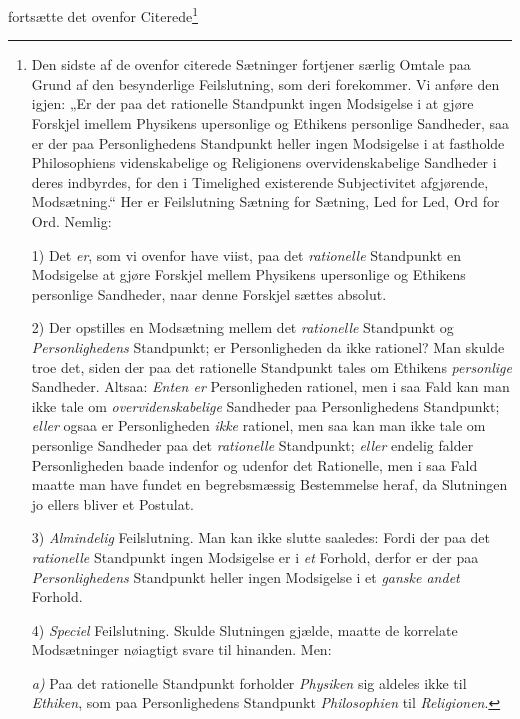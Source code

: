 \documentclass[12pt,a4paper]{book}
\begin{document}
fortsætte det ovenfor Citerede\footnote{Den sidste af de ovenfor citerede Sætninger fortjener særlig
Omtale paa Grund af den besynderlige Feilslutning, som
deri forekommer. Vi anføre den igjen: „Er der paa
det rationelle Standpunkt ingen Modsigelse i at gjøre
Forskjel imellem Physikens upersonlige og Ethikens personlige
Sandheder, saa er der paa Personlighedens Standpunkt
heller ingen Modsigelse i at fastholde Philosophiens
videnskabelige og Religionens overvidenskabelige Sandheder i
deres indbyrdes, for den i Timelighed existerende Subjectivitet
afgjørende, Modsætning.“ Her er Feilslutning Sætning
for Sætning, Led for Led, Ord for Ord. Nemlig:
\par 1) Det \emph{er}, som vi ovenfor have viist, paa det \emph{rationelle}
Standpunkt en Modsigelse at gjøre Forskjel mellem Physikens
upersonlige og Ethikens personlige Sandheder, naar
denne Forskjel sættes absolut.
\par 2) Der opstilles en Modsætning mellem det \emph{rationelle}
Standpunkt og \emph{Personlighedens} Standpunkt; er
Personligheden da ikke rationel? Man skulde troe det,
siden der paa det rationelle Standpunkt tales om Ethikens
\emph{personlige} Sandheder. Altsaa: \emph{Enten er} Personligheden
rationel, men i saa Fald kan man ikke tale
om \emph{overvidenskabelige} Sandheder paa Personlighedens
Standpunkt; \emph{eller} ogsaa er Personligheden \emph{ikke}
rationel, men saa kan man ikke tale om personlige Sandheder
paa det \emph{rationelle} Standpunkt; \emph{eller} endelig
falder Personligheden baade indenfor og udenfor det Rationelle,
men i saa Fald maatte man have fundet en
begrebsmæssig Bestemmelse heraf, da Slutningen jo ellers
bliver et Postulat.
\par 3) \emph{Almindelig} Feilslutning. Man kan ikke slutte saaledes:
Fordi der paa det \emph{rationelle} Standpunkt ingen
Modsigelse er i \emph{et} Forhold, derfor er der paa \emph{Personlighedens}
Standpunkt heller ingen Modsigelse i et
\emph{ganske andet} Forhold.
\par 4) \emph{Speciel} Feilslutning. Skulde Slutningen gjælde, maatte
de korrelate Modsætninger nøiagtigt svare til hinanden.
Men:
\par \textit{a)} Paa det rationelle Standpunkt forholder \emph{Physiken}
sig aldeles ikke til \emph{Ethiken}, som paa Personlighedens
Standpunkt \emph{Philosophien} til \emph{Religionen}.
}
\end{document}
